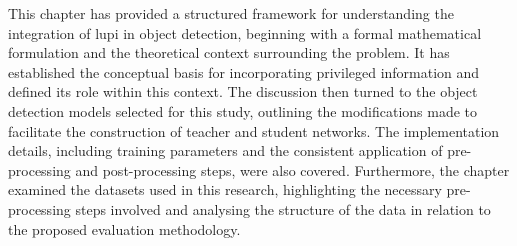 This chapter has provided a structured framework for understanding the integration of \gls{lupi} in object detection, beginning with a formal mathematical formulation and the theoretical context surrounding the problem. It has established the conceptual basis for incorporating privileged information and defined its role within this context. The discussion then turned to the object detection models selected for this study, outlining the modifications made to facilitate the construction of teacher and student networks. The implementation details, including training parameters and the consistent application of pre-processing and post-processing steps, were also covered. Furthermore, the chapter examined the datasets used in this research, highlighting the necessary pre-processing steps involved and analysing the structure of the data in relation to the proposed evaluation methodology.

